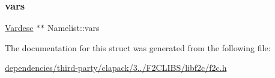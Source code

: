 \subsubsection{\texorpdfstring{vars}{vars}}
{\footnotesize\ttfamily \hyperlink{struct_vardesc}{Vardesc} $\ast$$\ast$ Namelist\+::vars}



The documentation for this struct was generated from the following file\+:\begin{DoxyCompactItemize}
\item 
\hyperlink{dependencies_2third-party_2clapack_23_82_81_2_f2_c_l_i_b_s_2libf2c_2f2c_8h}{dependencies/third-\/party/clapack/3../\+F2\+C\+L\+I\+B\+S/libf2c/f2c.\+h}\end{DoxyCompactItemize}
